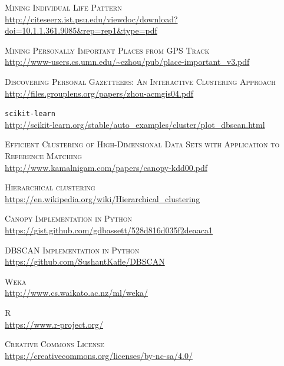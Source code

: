 \documentclass[a4paper, 12pt]{article}
\begin{document}
\newpage

\begin{thebibliography}{50}


\label{lifePatter} \textsc{Mining Individual Life Pattern} \\ \url{http://citeseerx.ist.psu.edu/viewdoc/download?doi=10.1.1.361.9085&rep=rep1&type=pdf}

\label{importantPlaces} \textsc{Mining Personally Important Places from GPS Track} \\ \url{http://www-users.cs.umn.edu/~czhou/pub/place-important_v3.pdf}

\label{clusteringApproach}\textsc{Discovering Personal Gazetteers: An Interactive Clustering Approach} \\ \url{http://files.grouplens.org/papers/zhou-acmgis04.pdf}

\label{scikit-learn} \texttt{scikit-learn} \\ \url{http://scikit-learn.org/stable/auto_examples/cluster/plot_dbscan.html} 

\label{canopy} \textsc{Efficient Clustering of High-Dimensional Data Sets with Application to Reference Matching} \\ \url{http://www.kamalnigam.com/papers/canopy-kdd00.pdf}

\label{jerar} \textsc{Hierarchical clustering} \\ \url{https://en.wikipedia.org/wiki/Hierarchical_clustering}

 \label{canopyGitHub} \textsc{Canopy Implementation in Python} \\ \url{https://gist.github.com/gdbassett/528d816d035f2deaaca1}

 \label{dbscanPython} \textsc{DBSCAN Implementation in Python} \\ \url{https://github.com/SushantKafle/DBSCAN}

 \label{weka} \textsc{Weka} \\ 	\url{http://www.cs.waikato.ac.nz/ml/weka/}

 \label{r} \textsc{R} \\ \url{https://www.r-project.org/}

 \label{creative} \textsc{Creative Commons License} \\ \url{https://creativecommons.org/licenses/by-nc-sa/4.0/}
\end{thebibliography}
\end{document}
